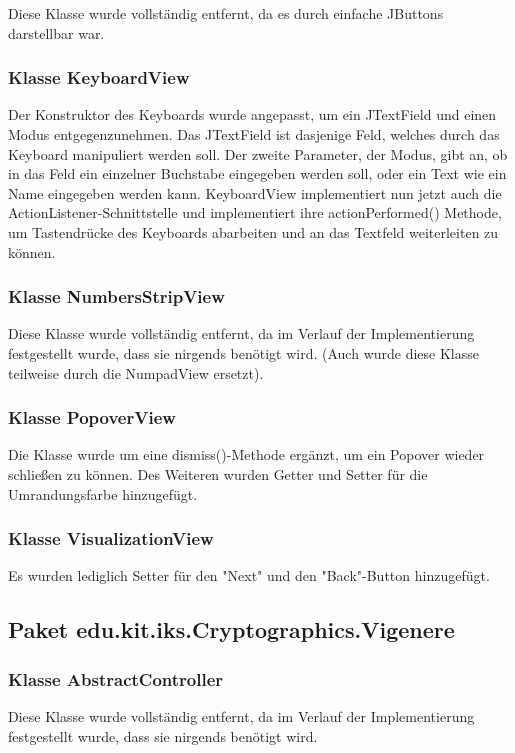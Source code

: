 \documentclass{article}
\begin{document}
	Diese Klasse wurde vollständig entfernt, da es durch einfache JButtons darstellbar war.

	\subsubsection{Klasse KeyboardView}

	Der Konstruktor des Keyboards wurde angepasst, um ein JTextField und einen Modus entgegenzunehmen.
	Das JTextField ist dasjenige Feld, welches durch das Keyboard manipuliert werden soll. Der zweite
	Parameter, der Modus, gibt an, ob in das Feld ein einzelner Buchstabe eingegeben werden soll, oder
	ein Text wie ein Name eingegeben werden kann. KeyboardView implementiert nun jetzt auch die
	ActionListener-Schnittstelle und implementiert ihre actionPerformed() Methode, um Tastendrücke
	des Keyboards abarbeiten und an das Textfeld weiterleiten zu können.

	\subsubsection{Klasse NumbersStripView}

	Diese Klasse wurde vollständig entfernt, da im Verlauf der Implementierung festgestellt wurde,
	dass sie nirgends benötigt wird. (Auch wurde diese Klasse teilweise durch die NumpadView ersetzt).

	\subsubsection{Klasse PopoverView}

	Die Klasse wurde um eine dismiss()-Methode ergänzt, um ein Popover wieder schließen zu können.
	Des Weiteren wurden Getter und Setter für die Umrandungsfarbe hinzugefügt.

	\subsubsection{Klasse VisualizationView}

	Es wurden lediglich Setter für den "Next" und den "Back"-Button hinzugefügt.

  \subsection{Paket edu.kit.iks.Cryptographics.Vigenere}
    \subsubsection{Klasse AbstractController}
	Diese Klasse wurde vollständig entfernt, da im Verlauf der Implementierung festgestellt wurde,
	dass sie nirgends benötigt wird.
	
\end{document}
